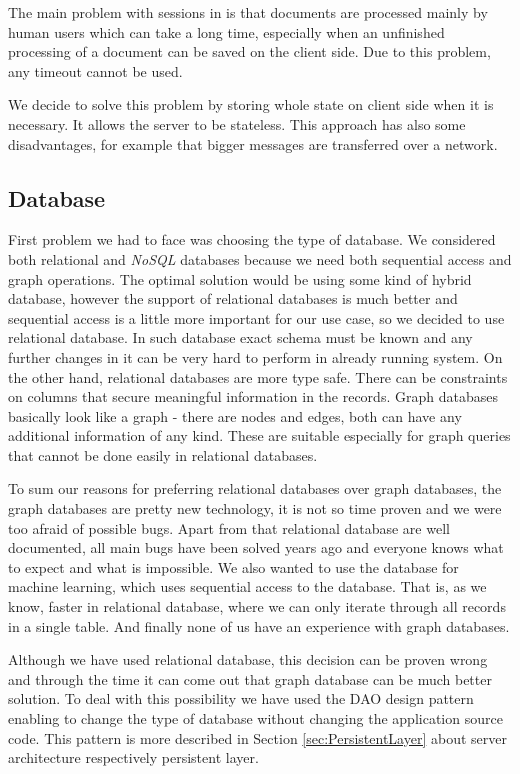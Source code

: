 The main problem with sessions in \textan{} is that documents are processed mainly
by human users which can take a long time, especially when an unfinished processing
of a document can be saved on the client side. Due to this problem, any timeout
cannot be used.

We decide to solve this problem by storing whole state on client side when it is
necessary. It allows the server to be stateless. This approach has also some
disadvantages, for example that bigger messages are transferred over a network.

\subsection{Database}

First problem we had to face was choosing the type of database. We considered
both relational and \emph{NoSQL} databases because we need both sequential
access and graph operations. The optimal solution would be using some kind of
hybrid database, however the support of relational databases is much better
and sequential access is a little more important for our use case, so we decided
to use relational database. In such database exact schema must be known and any
further changes in it can be very hard to perform in already running
system. On the other hand, relational databases are more type safe. There can be
constraints on columns that secure meaningful information in the records. Graph
databases basically look like a graph - there are nodes and edges, both can have
any additional information of any kind. These are suitable especially for graph
queries that cannot be done easily in relational databases.

To sum our reasons for preferring relational databases over graph databases, the
graph databases are pretty new technology, it is not so time proven and we
were too afraid of possible bugs. Apart from that relational database are well
documented, all main bugs have been solved years ago and everyone knows what to
expect and what is impossible.
We also wanted to use the database for machine learning, which uses sequential
access to the database. That is, as we know, faster in relational database,
where we can only iterate through all records in a single table.
And finally none of us have an experience with graph databases.

Although we have used relational database, this decision can be proven wrong and
through the time it can come out that graph database can be much better
solution. To deal with this possibility we have used the DAO design pattern
enabling to change the type of database without changing the application source
code. This pattern is more described in Section \ref{sec:PersistentLayer} about
server architecture respectively persistent layer.

